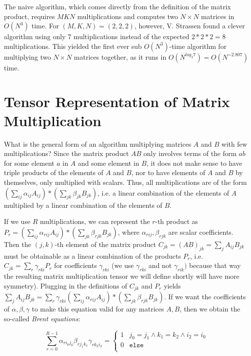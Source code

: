\documentclass{article}
\begin{document}
The naive algorithm, which comes directly from the definition of the matrix product, requires $MKN$ multiplications and computes two $N\times N$ matrices in $O(N^3)$ time. For $(M,K,N)=(2,2,2)$, however, V. Strassen found a clever algorithm using only 7 multiplications instead of the expected $2*2*2=8$ multiplications. This yielded the first ever sub $O(N^3)$-time algorithm for multiplying two $N\times N$ matrices together, as it runs in $O(N^{log_2 7})=O(N^{\sim 2.807})$ time.

\section{Tensor Representation of Matrix Multiplication}

What is the general form of an algorithm multiplying matrices $A$ and $B$ with few multiplications? Since the matrix product $AB$ only involves terms of the form $ab$ for some element $a$ in $A$ and some element in $B$, it does not make sense to have triple products of the elements of $A$ and $B$, nor to have elements of $A$ and $B$ by themselves, only multiplied with scalars. Thus, all multiplications are of the form $(\sum_{ij}\alpha_{ij}A_{ij})*(\sum_{jk}\beta_{jk}B_{jk})$, i.e. a linear combination of the elements of $A$ multiplied by a linear combination of the elements of $B$.

If we use $R$ multiplications, we can represent the $r$-th product as $P_r=(\sum_{ij}\alpha_{rij}A_{ij})*(\sum_{jk}\beta_{rjk}B_{jk})$, where $\alpha_{rij},\beta_{rjk}$ are scalar coefficients. Then the $(j,k)$-th element of the matrix product $C_{jk}=(AB)_{jk}=\sum_{j}A_{ij}B_{jk}$ must be obtainable as a linear combination of the products $P_r$, i.e. $C_{jk}=\sum_{r}\gamma_{rki}P_{r}$ for coefficients $\gamma_{rki}$ (we use $\gamma_{rki}$ and not $\gamma_{rik})$ because that way the resulting matrix multiplication tensor we will define shortly will have more symmetry). Plugging in the definitions of $C_{jk}$ and $P_r$ yields $\sum_{j}A_{ij}B_{jk}=\sum_{r}\gamma_{rki}(\sum_{ij}\alpha_{rij}A_{ij})*(\sum_{jk}\beta_{rjk}B_{jk})$. If we want the coefficients of $\alpha,\beta,\gamma$ to make this equation valid for any matrices $A,B$, then we obtain the so-called \textit{Brent equations}:

\[\sum_{r=0}^{R-1} \alpha_{ri_0j_0}\beta_{rj_1k_1}\gamma_{rk_2i_2}=\begin{cases}
1 & j_0=j_1 \wedge k_1=k_2 \wedge i_2=i_0 \\
0 & \texttt{else} \\
\end{cases}\]
\end{document}
